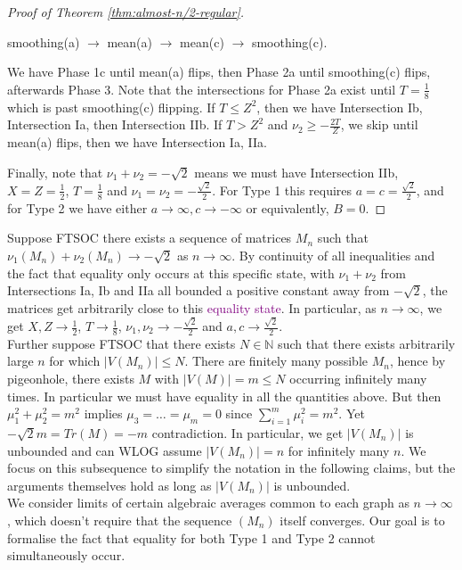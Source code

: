 \documentclass[11pt]{article}
\newcommand{\purp}[1]{\textcolor{purple}{#1}}
\begin{document}
\begin{proof}[Proof of Theorem \ref{thm:almost-n/2-regular}]
\begin{outline}
        \centerline{smoothing(a) $\to$ mean(a) $\to$ mean(c) $\to$ smoothing(c).}

        We have Phase 1c until mean(a) flips, then Phase 2a until smoothing(c) flips, afterwards Phase 3. Note that the intersections for Phase 2a exist until $T = \frac18$ which is past smoothing(c) flipping. 
        \3[-] If $T \le Z^2$, then we have Intersection Ib, Intersection Ia, then Intersection IIb. 
        \3[-] If $T > Z^2$ and $\nu_2 \ge -\frac{2T}{Z}$, we skip until mean(a) flips, then we have Intersection Ia, IIa.
    \end{outline}
    
    Finally, note that $\nu_1 + \nu_2 = -\sqrt{2}$ means we must have Intersection IIb, $X = Z = \frac12$, $T = \frac18$ and $\nu_1 = \nu_2 = -\frac{\sqrt{2}}{2}$. For Type 1 this requires $a = c = \frac{\sqrt{2}}{2}$, and for Type 2 we have either $a \to \infty, c \to -\infty$ or equivalently, $B = 0$.
\end{proof}

Suppose FTSOC there exists a sequence of matrices $M_n$ such that $\nu_1(M_n) + \nu_2(M_n) \to -\sqrt{2}$ as $n \to \infty$. By continuity of all inequalities and the fact that equality only occurs at this specific state, with $\nu_1 + \nu_2$ from Intersections Ia, Ib and IIa all bounded a positive constant away from $-\sqrt{2}$, the matrices get arbitrarily close to this \purp{equality state}. In particular, as $n \to \infty$, we get $X, Z \to \frac12$, $T \to \frac18$, $\nu_1, \nu_2 \to -\frac{\sqrt{2}}{2}$ and $a, c \to \frac{\sqrt{2}}{2}$. \\

Further suppose FTSOC that there exists $N \in \mathbb{N}$ such that there exists arbitrarily large $n$ for which $|V(M_n)| \le N$. There are finitely many possible $M_n$, hence by pigeonhole, there exists $M$ with $|V(M)| = m \le N$ occurring infinitely many times. In particular we must have equality in all the quantities above. But then $\mu_1^2 + \mu_2^2 = m^2$ implies $\mu_3 = \dots = \mu_m = 0$ since $\sum_{i=1}^m \mu_i^2 = m^2$. Yet $-\sqrt{2}m = Tr(M) = -m$ contradiction. In particular, we get $|V(M_n)|$ is unbounded and can WLOG assume $|V(M_n)| = n$ for infinitely many $n$. We focus on this subsequence to simplify the notation in the following claims, but the arguments themselves hold as long as $|V(M_n)|$ is unbounded. \\

We consider limits of certain algebraic averages common to each graph as $n \to \infty$, which doesn't require that the sequence $(M_n)$ itself converges. Our goal is to formalise the fact that equality for both Type 1 and Type 2 cannot simultaneously occur.
\end{document}
